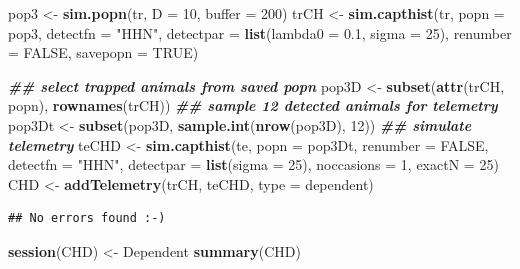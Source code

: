 \documentclass[
]{book}
\newenvironment{Shaded}{\begin{snugshade}}{\end{snugshade}}
\newcommand{\AttributeTok}[1]{\textcolor[rgb]{0.13,0.29,0.53}{#1}}
\newcommand{\ConstantTok}[1]{\textcolor[rgb]{0.56,0.35,0.01}{#1}}
\newcommand{\DecValTok}[1]{\textcolor[rgb]{0.00,0.00,0.81}{#1}}
\newcommand{\DocumentationTok}[1]{\textcolor[rgb]{0.56,0.35,0.01}{\textbf{\textit{#1}}}}
\newcommand{\FloatTok}[1]{\textcolor[rgb]{0.00,0.00,0.81}{#1}}
\newcommand{\FunctionTok}[1]{\textcolor[rgb]{0.13,0.29,0.53}{\textbf{#1}}}
\newcommand{\NormalTok}[1]{#1}
\newcommand{\OtherTok}[1]{\textcolor[rgb]{0.56,0.35,0.01}{#1}}
\newcommand{\StringTok}[1]{\textcolor[rgb]{0.31,0.60,0.02}{#1}}
\begin{document}
\begin{Shaded}
\begin{Highlighting}[]
\NormalTok{pop3 }\OtherTok{\textless{}{-}} \FunctionTok{sim.popn}\NormalTok{(tr, }\AttributeTok{D =} \DecValTok{10}\NormalTok{, }\AttributeTok{buffer =} \DecValTok{200}\NormalTok{)}
\NormalTok{trCH }\OtherTok{\textless{}{-}} \FunctionTok{sim.capthist}\NormalTok{(tr,  }\AttributeTok{popn =}\NormalTok{ pop3, }\AttributeTok{detectfn =} \StringTok{"HHN"}\NormalTok{, }
    \AttributeTok{detectpar =} \FunctionTok{list}\NormalTok{(}\AttributeTok{lambda0 =} \FloatTok{0.1}\NormalTok{, }\AttributeTok{sigma =} \DecValTok{25}\NormalTok{), }\AttributeTok{renumber =} 
    \ConstantTok{FALSE}\NormalTok{, }\AttributeTok{savepopn =} \ConstantTok{TRUE}\NormalTok{)}

\DocumentationTok{\#\# select trapped animals from saved popn}
\NormalTok{pop3D }\OtherTok{\textless{}{-}} \FunctionTok{subset}\NormalTok{(}\FunctionTok{attr}\NormalTok{(trCH, }\StringTok{\textquotesingle{}popn\textquotesingle{}}\NormalTok{), }\FunctionTok{rownames}\NormalTok{(trCH))}
\DocumentationTok{\#\# sample 12 detected animals for telemetry}
\NormalTok{pop3Dt }\OtherTok{\textless{}{-}} \FunctionTok{subset}\NormalTok{(pop3D, }\FunctionTok{sample.int}\NormalTok{(}\FunctionTok{nrow}\NormalTok{(pop3D), }\DecValTok{12}\NormalTok{))  }
\DocumentationTok{\#\# simulate telemetry}
\NormalTok{teCHD }\OtherTok{\textless{}{-}} \FunctionTok{sim.capthist}\NormalTok{(te, }\AttributeTok{popn =}\NormalTok{ pop3Dt, }\AttributeTok{renumber =} \ConstantTok{FALSE}\NormalTok{, }
    \AttributeTok{detectfn =} \StringTok{"HHN"}\NormalTok{, }\AttributeTok{detectpar =} \FunctionTok{list}\NormalTok{(}\AttributeTok{sigma =} \DecValTok{25}\NormalTok{), }
    \AttributeTok{noccasions =} \DecValTok{1}\NormalTok{, }\AttributeTok{exactN =} \DecValTok{25}\NormalTok{)}
\NormalTok{CHD }\OtherTok{\textless{}{-}} \FunctionTok{addTelemetry}\NormalTok{(trCH, teCHD, }\AttributeTok{type =} \StringTok{\textquotesingle{}dependent\textquotesingle{}}\NormalTok{)}
\end{Highlighting}
\end{Shaded}

\begin{verbatim}
## No errors found :-)
\end{verbatim}

\begin{Shaded}
\begin{Highlighting}[]
\FunctionTok{session}\NormalTok{(CHD) }\OtherTok{\textless{}{-}} \StringTok{\textquotesingle{}Dependent\textquotesingle{}}
\FunctionTok{summary}\NormalTok{(CHD)}
\end{Highlighting}
\end{Shaded}
\end{document}
